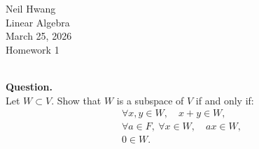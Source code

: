 \documentclass{article}
\begin{document}
\begin{flushright}
Neil Hwang\\
Linear Algebra\\
March 25, 2026\\
Homework 1\\

\end{flushright}






\hfill \break  $~\!\!$ \dotfill \medskip \\
\textbf{Question.}\\
Let $W \subset V$. Show that $W$ is a subspace of $V$ if and only if:
\begin{align*}
\forall x,y \in W,\quad x+y \in W, \\
\forall a \in F,\ \forall x \in W,\quad ax \in W, \\
0 \in W.
\end{align*}
\end{document}

